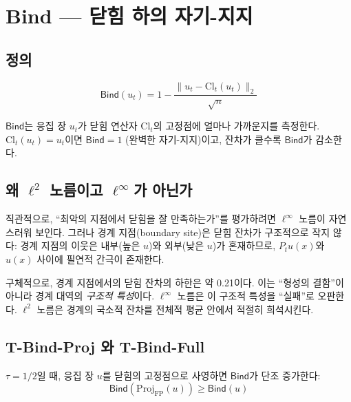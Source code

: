\section{Bind --- 닫힘 하의 자기-지지}
\label{sec:bind}

\subsection{정의}

\begin{equation}
    \mathsf{Bind}(u_t) = 1 - \frac{\|u_t - \mathrm{Cl}_t(u_t)\|_2}{\sqrt{n}}
    \label{eq:bind}
\end{equation}

$\mathsf{Bind}$는 응집 장 $u_t$가 닫힘 연산자 $\mathrm{Cl}_t$의 고정점에 얼마나 가까운지를 측정한다. $\mathrm{Cl}_t(u_t) = u_t$이면 $\mathsf{Bind} = 1$ (완벽한 자기-지지)이고, 잔차가 클수록 $\mathsf{Bind}$가 감소한다.

\subsection{왜 $\ell^2$ 노름이고 $\ell^\infty$가 아닌가}

직관적으로, ``최악의 지점에서 닫힘을 잘 만족하는가''를 평가하려면 $\ell^\infty$ 노름이 자연스러워 보인다. 그러나 경계 지점(boundary site)은 닫힘 잔차가 구조적으로 작지 않다: 경계 지점의 이웃은 내부(높은 $u$)와 외부(낮은 $u$)가 혼재하므로, $P_t u(x)$와 $u(x)$ 사이에 필연적 간극이 존재한다.

구체적으로, 경계 지점에서의 닫힘 잔차의 하한은 약 0.21이다. 이는 ``형성의 결함''이 아니라 경계 대역의 \emph{구조적 특성}이다. $\ell^\infty$ 노름은 이 구조적 특성을 ``실패''로 오판한다. $\ell^2$ 노름은 경계의 국소적 잔차를 전체적 평균 안에서 적절히 희석시킨다.

\subsection{T-Bind-Proj 와 T-Bind-Full}

\begin{theorem}
\label{thm:t-bind-proj}
$\tau = 1/2$일 때, 응집 장 $u$를 닫힘의 고정점으로 사영하면 $\mathsf{Bind}$가 단조 증가한다:
\begin{equation}
    \mathsf{Bind}(\mathrm{Proj}_{\mathrm{FP}}(u)) \geq \mathsf{Bind}(u)
    \label{eq:bind-proj}
\end{equation}
\end{theorem}

